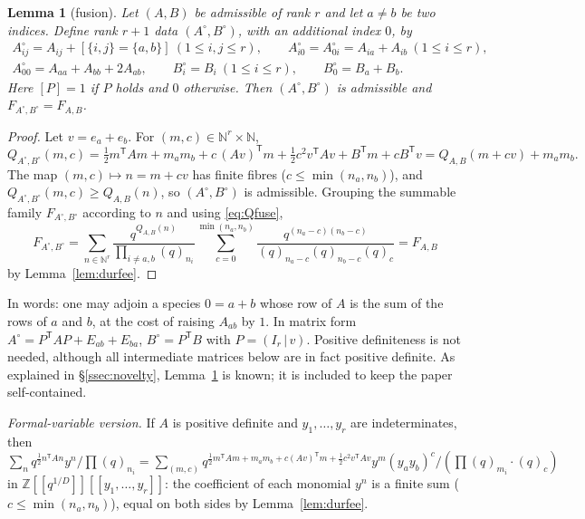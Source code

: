 \documentclass[11pt]{amsart}
\newtheorem{lemma}[theorem]{Lemma}
\theoremstyle{definition}
\numberwithin{equation}{section}
\newcommand{\Z}{\mathbb{Z}}
\newcommand{\N}{\mathbb{N}}
\newcommand{\T}{\mathsf T}
\begin{document}
\begin{lemma}[fusion]\label{lem:fusion}
Let $(A,B)$ be admissible of rank $r$ and let $a\ne b$ be two indices. Define rank $r+1$ data
$(A^\circ,B^\circ)$, with an additional index $0$, by
\begin{gather*}
A^\circ_{ij}=A_{ij}+[\{i,j\}=\{a,b\}]\ (1\le i,j\le r),\qquad A^\circ_{i0}=A^\circ_{0i}=A_{ia}+A_{ib}\ (1\le i\le r),\\
A^\circ_{00}=A_{aa}+A_{bb}+2A_{ab},\qquad B^\circ_i=B_i\ (1\le i\le r),\qquad B^\circ_0=B_a+B_b .
\end{gather*}
Here $[P]=1$ if $P$ holds and $0$ otherwise. Then $(A^\circ,B^\circ)$ is admissible and
$F_{A^\circ,B^\circ}=F_{A,B}$.
\end{lemma}
\begin{proof}
Let $v=e_a+e_b$. For $(m,c)\in\N^r\times\N$,
\begin{equation}\label{eq:Qfuse}
Q_{A^\circ,B^\circ}(m,c)=\tfrac12m^{\T}Am+m_am_b+c\,(Av)^{\T}m+\tfrac12c^2v^{\T}Av+B^{\T}m+cB^{\T}v=Q_{A,B}(m+cv)+m_am_b .
\end{equation}
The map $(m,c)\mapsto n=m+cv$ has finite fibres ($c\le\min(n_a,n_b)$), and $Q_{A^\circ,B^\circ}(m,c)\ge
Q_{A,B}(n)$, so $(A^\circ,B^\circ)$ is admissible. Grouping the summable family $F_{A^\circ,B^\circ}$
according to $n$ and using \eqref{eq:Qfuse},
\[
F_{A^\circ,B^\circ}=\sum_{n\in\N^r}\frac{q^{Q_{A,B}(n)}}{\prod_{i\ne a,b}(q)_{n_i}}
\sum_{c=0}^{\min(n_a,n_b)}\frac{q^{(n_a-c)(n_b-c)}}{(q)_{n_a-c}(q)_{n_b-c}(q)_c}=F_{A,B}
\]
by Lemma~\ref{lem:durfee}.
\end{proof}

In words: one may adjoin a species $0=a+b$ whose row of $A$ is the sum of the rows of $a$ and $b$, at the
cost of raising $A_{ab}$ by $1$. In matrix form $A^\circ=P^{\T}AP+E_{ab}+E_{ba}$, $B^\circ=P^{\T}B$ with
$P=(I_r\,|\,v)$. Positive definiteness is not needed, although all intermediate matrices below are in fact
positive definite. As explained in §\ref{ssec:novelty}, Lemma~\ref{lem:fusion} is known; it is
included to keep the paper self-contained.

\emph{Formal-variable version.} If $A$ is positive definite and $y_1,\dots,y_r$ are indeterminates,
then
$\sum_nq^{\frac12n^{\T}An}y^n/\prod(q)_{n_i}=\sum_{(m,c)}q^{\frac12m^{\T}Am+m_am_b+c(Av)^{\T}m+\frac12c^2v^{\T}Av}y^m(y_ay_b)^c/(\prod(q)_{m_i}\cdot(q)_c)$
in $\Z[[q^{1/D}]][[y_1,\dots,y_r]]$: the coefficient of each monomial $y^n$ is a finite sum ($c\le\min(n_a,n_b)$),
equal on both sides by Lemma~\ref{lem:durfee}.
\end{document}
